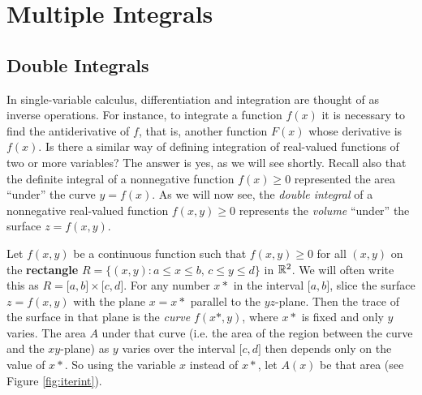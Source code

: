 \chapter{Multiple Integrals}
\label{chapter:mult-integrals}
\section{Double Integrals}
In single-variable calculus, differentiation and integration are thought of as inverse operations. For instance, to
integrate a function $f(x)$ it is necessary to find the antiderivative of $f$, that is, another function $F(x)$
whose derivative is $f(x)$. Is there a similar way of defining integration of real-valued functions of two or
more variables? The answer is yes, as we will see shortly. Recall also that the definite integral of a
nonnegative function $f(x) \ge 0$ represented the area ``under'' the curve $y=f(x)$. As we will now see, the
\emph{double integral} of a nonnegative real-valued function $f(x,y) \ge 0$ represents the \emph{volume} ``under'' the
surface $z=f(x,y)$.

Let $f(x,y)$ be a continuous function such that $f(x,y) \ge 0$ for all $(x,y)$ on the \textbf{rectangle}
$R = \lbrace (x,y): a \le x \le b ,\, c \le y \le d \rbrace$ in $\mathbb{R}^{2}$. We will often write this as
$R = \lbrack a,b \rbrack \times \lbrack c,d \rbrack$. For any number $x*$ in the interval $\lbrack a,b \rbrack$, slice
the surface $z=f(x,y)$ with the plane $x=x*$ parallel to the $yz$-plane.
Then the trace of the surface in that plane is the \emph{curve} $f(x*,y)$, where $x*$ is fixed and only $y$
varies. The area $A$ under that curve (i.e. the area of the region between the curve and the $xy$-plane) as $y$ varies
over the interval $\lbrack c,d \rbrack$ then depends only on the value of $x*$. So using the variable $x$ instead of
$x*$, let $A(x)$ be that area (see Figure \ref{fig:iterint}).


